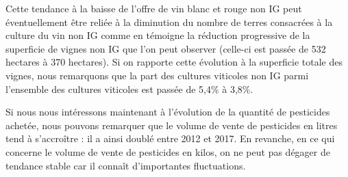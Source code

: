 \documentclass[11pt, a4paper]{article}
\begin{document}
\par
Cette tendance à la baisse de l’offre de vin blanc et rouge non IG peut éventuellement être reliée à la diminution du nombre de terres consacrées à la culture du vin non IG comme en témoigne la réduction progressive de la superficie de vignes non IG que l’on peut observer (celle-ci est passée de 532 hectares à 370 hectares). Si on rapporte cette évolution à la superficie totale des vignes, nous remarquons que la part des cultures viticoles non IG parmi l’ensemble des cultures viticoles est passée de 5,4\% à 3,8\%.
\par 
Si nous nous intéressons maintenant à l’évolution de la quantité de pesticides achetée, nous pouvons remarquer que le volume de vente de pesticides en litres tend à s’accroître : il a ainsi doublé entre 2012 et 2017. En revanche, en ce qui concerne le volume de vente de pesticides en kilos, on ne peut pas dégager de tendance stable car il connaît d’importantes fluctuations.
\par
\end{document}

